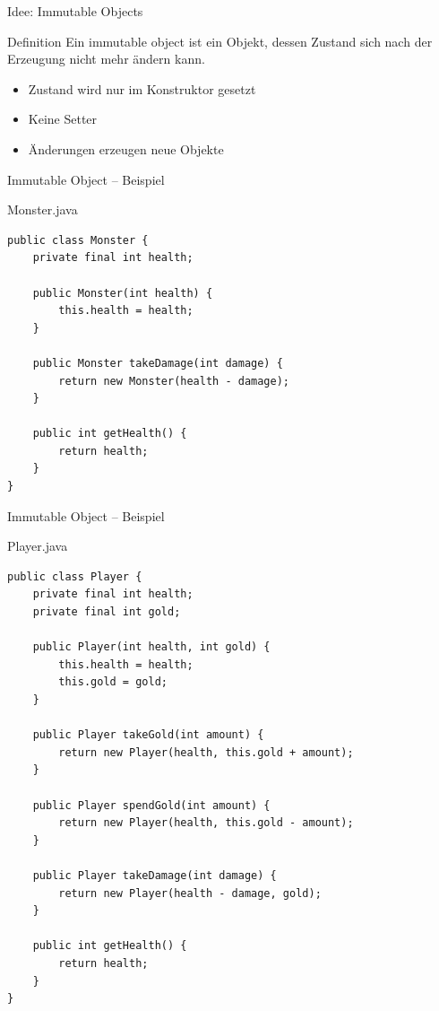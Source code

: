 \begin{frame}{Idee: Immutable Objects}
    \begin{block}{Definition}
        Ein immutable object ist ein Objekt, dessen Zustand sich nach
        der Erzeugung nicht mehr ändern kann.
    \end{block}
    \pause
    \begin{itemize}
        \item Zustand wird nur im Konstruktor gesetzt
        \item Keine Setter
        \item Änderungen erzeugen neue Objekte
    \end{itemize}
\end{frame}

\begin{frame}[fragile]{Immutable Object – Beispiel}
    \begin{exampleblock}{Monster.java}
        \begin{lstlisting}
public class Monster {
    private final int health;

    public Monster(int health) {
        this.health = health;
    }

    public Monster takeDamage(int damage) {
        return new Monster(health - damage);
    }

    public int getHealth() {
        return health;
    }
}
        \end{lstlisting}
    \end{exampleblock}
\end{frame}

\begin{frame}[fragile]{Immutable Object – Beispiel}
    \begin{exampleblock}{Player.java}
        \begin{lstlisting}[basicstyle=\tiny]
public class Player {
	private final int health;
	private final int gold;

    public Player(int health, int gold) {
        this.health = health;
        this.gold = gold;
    }
    
    public Player takeGold(int amount) {
    	return new Player(health, this.gold + amount);
    }
    
    public Player spendGold(int amount) {
    	return new Player(health, this.gold - amount);
    }

    public Player takeDamage(int damage) {
        return new Player(health - damage, gold);
    }

    public int getHealth() {
        return health;
    }
}
        \end{lstlisting}
    \end{exampleblock}
\end{frame}

